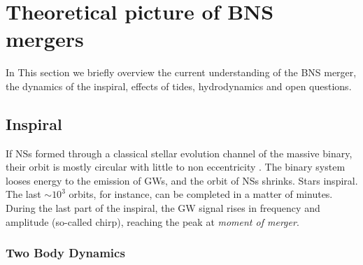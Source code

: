 
\section{Theoretical picture of \ac{BNS} mergers}

In This section we briefly overview the current understanding of the \ac{BNS} 
merger, the dynamics of the inspiral, effects of tides, \pmerg{} hydrodynamics 
and open questions.


\subsection{Inspiral}

If \acp{NS} formed through a classical stellar evolution channel of the massive binary, 
their orbit is mostly circular with little to non eccentricity \cite{4}. 
%
The binary system looses energy to the emission of \acp{GW}, and the orbit of \acp{NS} 
shrinks. Stars inspiral. The last ${\sim}10^3$ orbits, for instance, can be completed in 
a matter of minutes. During the last part of the inspiral, the \ac{GW} signal rises in 
frequency and amplitude (so-called chirp), reaching the peak at \textit{moment of merger}.


\subsubsection{Two Body Dynamics}

